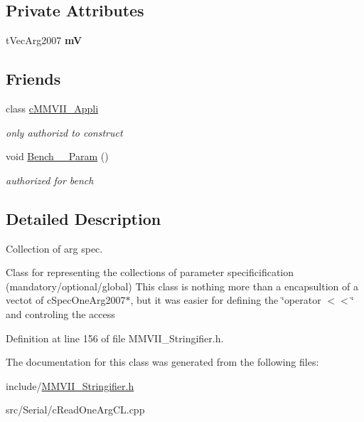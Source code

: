 \subsection*{Private Attributes}
\begin{DoxyCompactItemize}
\item 
t\+Vec\+Arg2007 {\bfseries mV}\hypertarget{classMMVII_1_1cCollecSpecArg2007_ad397d7f814f223a24b559136dc862ccf}{}\label{classMMVII_1_1cCollecSpecArg2007_ad397d7f814f223a24b559136dc862ccf}

\end{DoxyCompactItemize}
\subsection*{Friends}
\begin{DoxyCompactItemize}
\item 
class \hyperlink{classMMVII_1_1cCollecSpecArg2007_ae5174683821850dc223a1e9ce598b645}{c\+M\+M\+V\+I\+I\+\_\+\+Appli}\hypertarget{classMMVII_1_1cCollecSpecArg2007_ae5174683821850dc223a1e9ce598b645}{}\label{classMMVII_1_1cCollecSpecArg2007_ae5174683821850dc223a1e9ce598b645}

\begin{DoxyCompactList}\small\item\em only authorizd to construct \end{DoxyCompactList}\item 
void \hyperlink{classMMVII_1_1cCollecSpecArg2007_a34f69711abab3786f939f73f0bc15ba1}{Bench\+\_\+\_\+\+Param} ()\hypertarget{classMMVII_1_1cCollecSpecArg2007_a34f69711abab3786f939f73f0bc15ba1}{}\label{classMMVII_1_1cCollecSpecArg2007_a34f69711abab3786f939f73f0bc15ba1}

\begin{DoxyCompactList}\small\item\em authorized for bench \end{DoxyCompactList}\end{DoxyCompactItemize}


\subsection{Detailed Description}
Collection of arg spec. 

Class for representing the collections of parameter specificification (mandatory/optional/global) This class is nothing more than a encapsultion of a vectot of c\+Spec\+One\+Arg2007$\ast$, but it was easier for defining the \char`\"{}operator $<$$<$\char`\"{} and controling the access 

Definition at line 156 of file M\+M\+V\+I\+I\+\_\+\+Stringifier.\+h.



The documentation for this class was generated from the following files\+:\begin{DoxyCompactItemize}
\item 
include/\hyperlink{MMVII__Stringifier_8h}{M\+M\+V\+I\+I\+\_\+\+Stringifier.\+h}\item 
src/\+Serial/c\+Read\+One\+Arg\+C\+L.\+cpp\end{DoxyCompactItemize}
